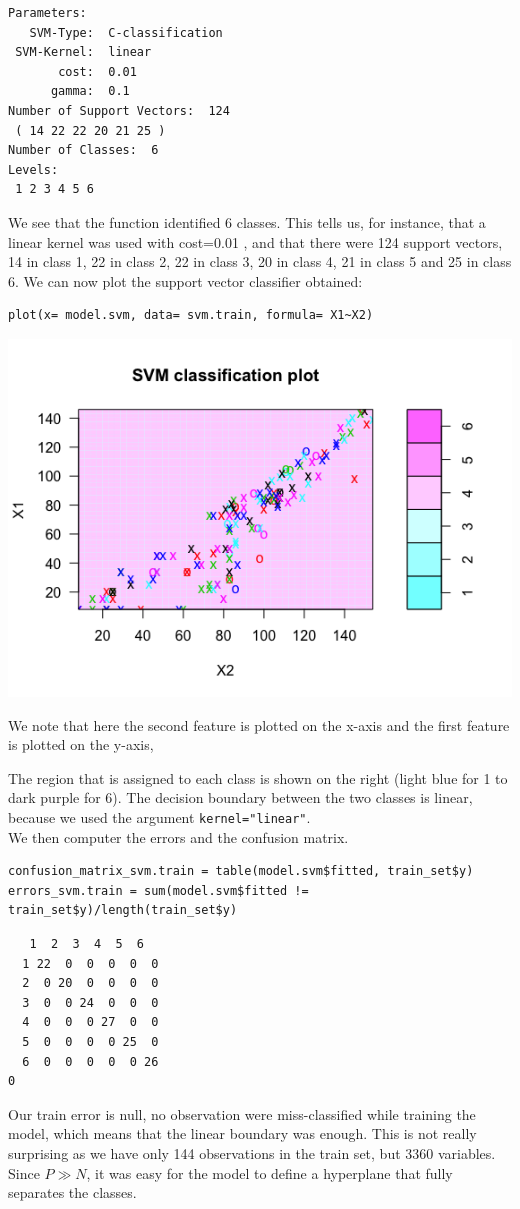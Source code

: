 \documentclass[]{report}
\begin{document}
\begin{verbatim}
Parameters:
   SVM-Type:  C-classification 
 SVM-Kernel:  linear 
       cost:  0.01 
      gamma:  0.1 
Number of Support Vectors:  124
 ( 14 22 22 20 21 25 )
Number of Classes:  6 
Levels: 
 1 2 3 4 5 6
\end{verbatim}
We see that the function identified 6 classes. This tells us, for instance, that a linear kernel was used with cost=0.01 , and that there were 124 support vectors, 14 in class 1, 22 in class 2, 22 in class 3, 20 in class 4, 21 in class 5 and 25 in class 6. 
We can now plot the support vector classifier obtained:
\begin{lstlisting}
plot(x= model.svm, data= svm.train, formula= X1~X2)
\end{lstlisting}
\begin{center}
	\includegraphics[width=0.8\linewidth]{Figures/svm_train_plot.png}
	\label{SVM on train set}
\end{center}
We note that here the second feature is plotted on the x-axis and the first feature is plotted on the y-axis, 

The region that is assigned to each class is shown on the right (light blue for 1 to dark purple for 6). The decision boundary between the two classes is linear, because we used the argument \texttt{kernel="linear"}. 
\\We then computer the errors and the confusion matrix.
\pagebreak
\begin{lstlisting}
confusion_matrix_svm.train = table(model.svm$fitted, train_set$y)
errors_svm.train = sum(model.svm$fitted != train_set$y)/length(train_set$y)
\end{lstlisting}
\begin{verbatim}
   1  2  3  4  5  6
  1 22  0  0  0  0  0
  2  0 20  0  0  0  0
  3  0  0 24  0  0  0
  4  0  0  0 27  0  0
  5  0  0  0  0 25  0
  6  0  0  0  0  0 26
0
\end{verbatim}
Our train error is null, no observation were miss-classified while training the model, which means that the linear boundary was enough. This is not really surprising as we have only 144 observations in the train set, but 3360 variables. Since $P \gg N$, it was easy for the model to define a hyperplane that fully separates the classes. 
\end{document}

